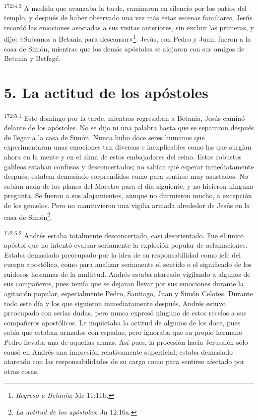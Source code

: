 \par 
\textsuperscript{172:4.3} A medida que avanzaba la tarde, caminaron en silencio por los patios del templo, y después de haber observado una vez más estas escenas familiares, Jesús recordó las emociones asociadas a sus visitas anteriores, sin excluir las primeras, y dijo: «Subamos a Betania para descansar»\footnote{\textit{Regreso a Betania}: Mc 11:11b.}. Jesús, con Pedro y Juan, fueron a la casa de Simón, mientras que los demás apóstoles se alojaron con sus amigos de Betania y Betfagé.

\section*{5. La actitud de los apóstoles}
\par 
\textsuperscript{172:5.1} Este domingo por la tarde, mientras regresaban a Betania, Jesús caminó delante de los apóstoles. No se dijo ni una palabra hasta que se separaron después de llegar a la casa de Simón. Nunca hubo doce seres humanos que experimentaran unas emociones tan diversas e inexplicables como las que surgían ahora en la mente y en el alma de estos embajadores del reino. Estos robustos galileos estaban confusos y desconcertados; no sabían qué esperar inmediatamente después; estaban demasiado sorprendidos como para sentirse muy asustados. No sabían nada de los planes del Maestro para el día siguiente, y no hicieron ninguna pregunta. Se fueron a sus alojamientos, aunque no durmieron mucho, a excepción de los gemelos. Pero no mantuvieron una vigilia armada alrededor de Jesús en la casa de Simón\footnote{\textit{La actitud de los apóstoles}: Jn 12:16a.}.

\par 
\textsuperscript{172:5.2} Andrés estaba totalmente desconcertado, casi desorientado. Fue el único apóstol que no intentó evaluar seriamente la explosión popular de aclamaciones. Estaba demasiado preocupado por la idea de su responsabilidad como jefe del cuerpo apostólico, como para analizar seriamente el sentido o el significado de los ruidosos hosannas de la multitud. Andrés estaba atareado vigilando a algunos de sus compañeros, pues temía que se dejaran llevar por sus emociones durante la agitación popular, especialmente Pedro, Santiago, Juan y Simón Celotes. Durante todo este día y los que siguieron inmediatamente después, Andrés estuvo preocupado con serias dudas, pero nunca expresó ninguno de estos recelos a sus compañeros apostólicos. Le inquietaba la actitud de algunos de los doce, pues sabía que estaban armados con espadas; pero ignoraba que su propio hermano Pedro llevaba una de aquellas armas. Así pues, la procesión hacia Jerusalén sólo causó en Andrés una impresión relativamente superficial; estaba demasiado atareado con las responsabilidades de su cargo como para sentirse afectado por otras cosas.

